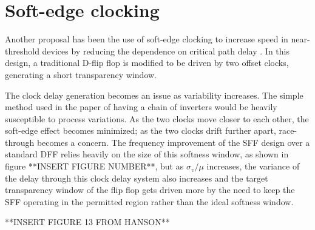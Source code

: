  \section{Soft-edge clocking}
Another proposal has been the use of soft-edge clocking to increase speed in near-threshold devices by reducing the dependence on critical path delay \cite{Wieckowski:2008bo}.
 In this design, a traditional D-flip flop is modified to be driven by two offset clocks, generating a short transparency window.

The clock delay generation becomes an issue as variability increases.
 The simple method used in the paper of having a chain of inverters would be heavily susceptible to process variations.
 As the two clocks move closer to each other, the soft-edge effect becomes minimized; as the two clocks drift further apart, race-through becomes a concern.
 The frequency improvement of the SFF design over a standard DFF relies heavily on the size of this softness window, as shown in figure **INSERT FIGURE NUMBER**, but as $\sigma_v/\mu$ increases, the variance of the delay through this clock delay system also increases and the target transparency window of the flip flop gets driven more by the need to keep the SFF operating in the permitted region rather than the ideal softness window.

**INSERT FIGURE 13 FROM HANSON**
